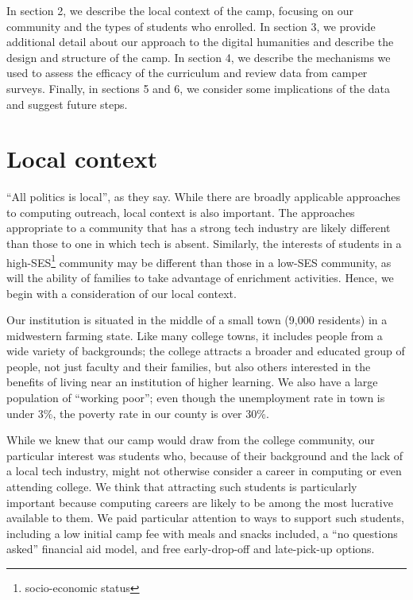 In section 2, we describe the local context of the camp, focusing
on our community and the types of students who enrolled.  In section
3, we provide additional detail about our approach to the digital
humanities and describe the design and structure of the camp.  In
section 4, we describe the mechanisms we used to assess the efficacy
of the curriculum and review data from camper surveys.  Finally,
in sections 5 and 6, we consider some implications of the data and
suggest future steps.

\section{Local context}

``All politics is local'', as they say.  While there are broadly
applicable approaches to computing outreach, local context is also
important.  The approaches appropriate to a community that has a
strong tech industry are likely different than those to one in which
tech is absent.  Similarly, the interests of students in a
high-SES\footnote{socio-economic status} community may be different
than those in a low-SES community, as will the ability of families
to take advantage of enrichment activities.  Hence, we begin with
a consideration of our local context.

Our institution is situated in the middle of a small town (9,000
residents) in a midwestern farming state.  Like many college towns,
it includes people from a wide variety of backgrounds; the college
attracts a broader and educated group of people, not just faculty
and their families, but also others interested in the benefits of living
near an institution of higher learning.  
We also have a large population of ``working poor''; even
though the unemployment rate in town is under 3\%, the poverty rate
in our county is over 30\%.

While we knew that our camp would draw from the college community,
our particular interest was students who, because of their background
and the lack of a local tech industry, might not otherwise consider
a career in computing or even attending college.  We think that
attracting such students is particularly important because computing
careers are likely to be among the most lucrative available to them.
We paid particular attention to ways to support such students,
including a low initial camp fee with meals and snacks included, a
``no questions asked'' financial aid model, and free early-drop-off
and late-pick-up options.

